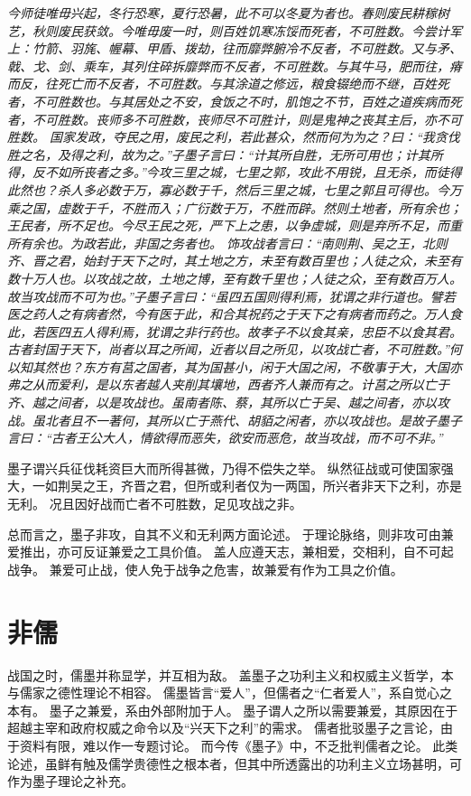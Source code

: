 \documentclass[11pt]{article}
\begin{document}
\textit{今师徒唯毋兴起，冬行恐寒，夏行恐暑，此不可以冬夏为者也。春则废民耕稼树艺，秋则废民获敛。今唯毋废一时，则百姓饥寒冻馁而死者，不可胜数。今尝计军上：竹箭、羽旄、幄幕、甲盾、拨劫，往而靡弊腑冷不反者，不可胜数。又与矛、戟、戈、剑、乘车，其列住碎拆靡弊而不反者，不可胜数。与其牛马，肥而往，瘠而反，往死亡而不反者，不可胜数。与其涂道之修远，粮食辍绝而不继，百姓死者，不可胜数也。与其居处之不安，食饭之不时，肌饱之不节，百姓之道疾病而死者，不可胜数。丧师多不可胜数，丧师尽不可胜计，则是鬼神之丧其主后，亦不可胜数。
\newline
国家发政，夺民之用，废民之利，若此甚众，然而何为为之？曰：“我贪伐胜之名，及得之利，故为之。”子墨子言曰：“计其所自胜，无所可用也；计其所得，反不如所丧者之多。”今攻三里之城，七里之郭，攻此不用锐，且无杀，而徒得此然也？杀人多必数于万，寡必数于千，然后三里之城，七里之郭且可得也。今万乘之国，虚数于千，不胜而入；广衍数于万，不胜而辟。然则土地者，所有余也；王民者，所不足也。今尽王民之死，严下上之患，以争虚城，则是弃所不足，而重所有余也。为政若此，非国之务者也。
\newline
饰攻战者言曰：“南则荆、吴之王，北则齐、晋之君，始封于天下之时，其土地之方，未至有数百里也；人徒之众，未至有数十万人也。以攻战之故，土地之博，至有数千里也；人徒之众，至有数百万人。故当攻战而不可为也。”子墨子言曰：“虽四五国则得利焉，犹谓之非行道也。譬若医之药人之有病者然，今有医于此，和合其祝药之于天下之有病者而药之。万人食此，若医四五人得利焉，犹谓之非行药也。故孝子不以食其亲，忠臣不以食其君。古者封国于天下，尚者以耳之所闻，近者以目之所见，以攻战亡者，不可胜数。”何以知其然也？东方有莒之国者，其为国甚小，闲于大国之闲，不敬事于大，大国亦弗之从而爱利，是以东者越人夹削其壤地，西者齐人兼而有之。计莒之所以亡于齐、越之间者，以是攻战也。虽南者陈、蔡，其所以亡于吴、越之间者，亦以攻战。虽北者且不一著何，其所以亡于燕代、胡貊之闲者，亦以攻战也。是故子墨子言曰：“古者王公大人，情欲得而恶失，欲安而恶危，故当攻战，而不可不非。”}

墨子谓兴兵征伐耗资巨大而所得甚微，乃得不偿失之举。
纵然征战或可使国家强大，一如荆吴之王，齐晋之君，但所或利者仅为一两国，所兴者非天下之利，亦是无利。
况且因好战而亡者不可胜数，足见攻战之非。

\par

总而言之，墨子非攻，自其不义和无利两方面论述。
于理论脉络，则非攻可由兼爱推出，亦可反证兼爱之工具价值。
盖人应遵天志，兼相爱，交相利，自不可起战争。
兼爱可止战，使人免于战争之危害，故兼爱有作为工具之价值。

\section{非儒}
战国之时，儒墨并称显学，并互相为敌。
盖墨子之功利主义和权威主义哲学，本与儒家之德性理论不相容。
儒墨皆言“爱人”，但儒者之“仁者爱人”，系自觉心之本有。
墨子之兼爱，系由外部附加于人。
墨子谓人之所以需要兼爱，其原因在于超越主宰和政府权威之命令以及“兴天下之利”的需求。
儒者批驳墨子之言论，由于资料有限，难以作一专题讨论。
而今传《墨子》中，不乏批判儒者之论。
此类论述，虽鲜有触及儒学贵德性之根本者，但其中所透露出的功利主义立场甚明，可作为墨子理论之补充。
\end{document}
